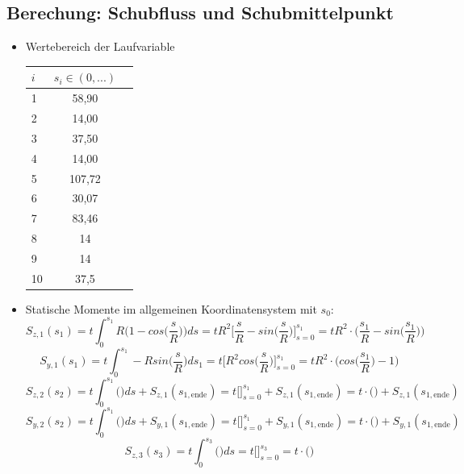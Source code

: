 \subsection{Berechung: Schubfluss und Schubmittelpunkt}
\begin{itemize}
	\item Wertebereich der Laufvariable
	\begin{center}
		\begin{tabular}[h]{l|c|c}
			$i$&$s_i\in(0,...)$\\
			\hline
			1&58,90\\
			2&14,00\\
			3&37,50\\
			4&14,00\\
			5&107,72\\
			6&30,07\\
			7&83,46\\
			8&14\\
			9&14\\
			10&37,5\\
		\end{tabular}
	\end{center}
	\item Statische Momente im allgemeinen Koordinatensystem mit $s_0$:
	\begin{equation}
		S_{z,1}(s_1) = t\int_{0}^{s_1} R\bigg(1-cos\bigg(\frac{s}{R}\bigg)\bigg)ds = tR^2\bigg[\frac{s}{R} - sin\bigg(\frac{s}{R}\bigg)\bigg]_{s=0}^{s_1} = tR^2\cdot\bigg(\frac{s_1}{R}-sin\bigg(\frac{s_1}{R}\bigg)\bigg)
	\end{equation}
	\begin{equation}
		S_{y,1}(s_1) = t\int_{0}^{s_1} -Rsin\bigg(\frac{s}{R}\bigg)ds_1 = t\biggl[ R^2 cos\bigg(\frac{s}{R}\bigg)\biggr]^{s_1}_{s=0} = tR^2 \cdot\bigg(cos\bigg(\frac{s_1}{R}\bigg)-1\bigg)
	\end{equation}
\begin{equation}
	S_{z,2}(s_2) = t\int_{0}^{s_1}\bigg(\bigg)ds + S_{z,1}(s_{1,\mathrm{ende}}) = t\bigg[\bigg]_{s=0}^{s_1} + S_{z,1}(s_{1,\mathrm{ende}}) = t\cdot\bigg(\bigg) + S_{z,1}(s_{1,\mathrm{ende}})
\end{equation}
\begin{equation}
	S_{y,2}(s_2) = t\int_{0}^{s_1}\bigg(\bigg)ds + S_{y,1}(s_{1,\mathrm{ende}}) = t\bigg[\bigg]_{s=0}^{s_1} + S_{y,1}(s_{1,\mathrm{ende}}) = t\cdot\bigg(\bigg) + S_{y,1}(s_{1,\mathrm{ende}})
\end{equation}
\begin{equation}
	S_{z,3}(s_3) = t\int_{0}^{s_3}\bigg(\bigg)ds = t\bigg[\bigg]_{s=0}^{s_3} = t\cdot\bigg(\bigg)

\end{equation}
\end{itemize}
